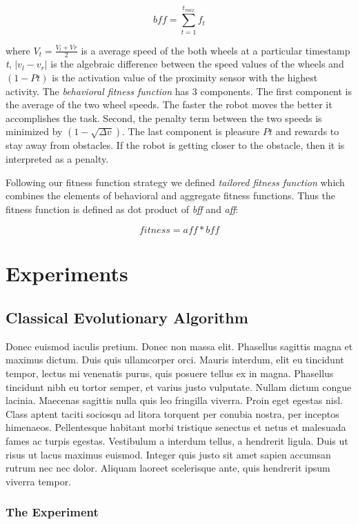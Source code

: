 \documentclass[format=acmsmall, review=false, screen=true]{acmart}
\begin{document}
\[ bff = \sum_{t=1}^{t_{max}} f_{t} \]


where \(V_{t} = \frac{V_{l} + V_{}r}{2} \) is a average speed of the both wheels at a particular timestamp \emph{t}, \(|v_{l} - v_{r}|\) is the algebraic difference between the speed values of the wheels and \((1 - P{t})\) is the activation value of the proximity sensor with the highest activity. The \emph{behavioral fitness function} has 3 components. The first component is the average of the two wheel speeds. The faster the robot moves the better it accomplishes the task. Second, the penalty term between the two speeds is minimized by \((1-\sqrt{\Delta v})\). The last component is pleasure \(P{t}\) and rewards to stay away from obstacles. If the robot is getting closer to the obstacle, then it is interpreted as a penalty.

Following our fitness function strategy we defined \emph{tailored fitness function} which combines the elements of behavioral and aggregate fitness functions. Thus the fitness function is defined as dot product of \emph{bff} and \emph{aff}:

\[ fitness = aff * bff \]

\section{Experiments}

\subsection{Classical Evolutionary Algorithm}

Donec euismod iaculis pretium. Donec non massa elit. Phasellus sagittis magna et maximus dictum. Duis quis ullamcorper orci. Mauris interdum, elit eu tincidunt tempor, lectus mi venenatis purus, quis posuere tellus ex in magna. Phasellus tincidunt nibh eu tortor semper, et varius justo vulputate. Nullam dictum congue lacinia. Maecenas sagittis nulla quis leo fringilla viverra. Proin eget egestas nisl. Class aptent taciti sociosqu ad litora torquent per conubia nostra, per inceptos himenaeos. Pellentesque habitant morbi tristique senectus et netus et malesuada fames ac turpis egestas. Vestibulum a interdum tellus, a hendrerit ligula. Duis ut risus ut lacus maximus euismod. Integer quis justo sit amet sapien accumsan rutrum nec nec dolor. Aliquam laoreet scelerisque ante, quis hendrerit ipsum viverra tempor.

\subsubsection{The Experiment}
\end{document}
